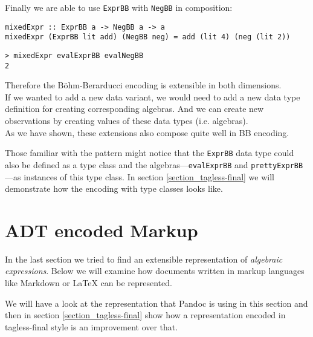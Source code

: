 Finally we are able to use \texttt{ExprBB} with \texttt{NegBB} in composition:

\begin{lstlisting}
mixedExpr :: ExprBB a -> NegBB a -> a
mixedExpr (ExprBB lit add) (NegBB neg) = add (lit 4) (neg (lit 2))
\end{lstlisting}
\begin{lstlisting}
> mixedExpr evalExprBB evalNegBB
2
\end{lstlisting}

Therefore the Böhm-Berarducci encoding is extensible in both dimensions.\\
If we wanted to add a new data variant, we would need to add a new data type
definition for creating corresponding algebras. And we can create new
observations by creating values of these data types (i.e. algebras).\\
As we have shown, these extensions also compose quite well in BB encoding.

Those familiar with the  pattern
\cite{scrap_type_classes} might notice that the \texttt{ExprBB} data type could
also be defined as a type class and the algebras—\texttt{evalExprBB} and
\texttt{prettyExprBB}—as instances of this type class. In section
\ref{section_tagless-final} we will demonstrate how the encoding with type
classes looks like.

%
\clearpage

\section{ADT encoded Markup}
\label{main_section}

In the last section we tried to find an extensible representation of
\emph{algebraic expressions}. Below we will examine how documents written in
markup languages like Markdown or \LaTeX{} can be represented.

We will have a look at the representation that Pandoc is using in this section
and then in section \ref{section_tagless-final} show how a representation
encoded in tagless-final style is an improvement over that.

